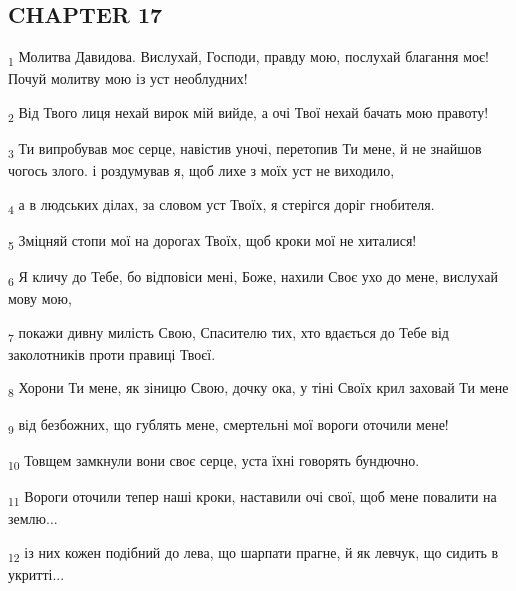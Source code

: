 \subsection{CHAPTER 17}
\begin{tcolorbox}
\textsubscript{1} Молитва Давидова. Вислухай, Господи, правду мою, послухай благання моє! Почуй молитву мою із уст необлудних!
\end{tcolorbox}
\begin{tcolorbox}
\textsubscript{2} Від Твого лиця нехай вирок мій вийде, а очі Твої нехай бачать мою правоту!
\end{tcolorbox}
\begin{tcolorbox}
\textsubscript{3} Ти випробував моє серце, навістив уночі, перетопив Ти мене, й не знайшов чогось злого. і роздумував я, щоб лихе з моїх уст не виходило,
\end{tcolorbox}
\begin{tcolorbox}
\textsubscript{4} а в людських ділах, за словом уст Твоїх, я стерігся доріг гнобителя.
\end{tcolorbox}
\begin{tcolorbox}
\textsubscript{5} Зміцняй стопи мої на дорогах Твоїх, щоб кроки мої не хиталися!
\end{tcolorbox}
\begin{tcolorbox}
\textsubscript{6} Я кличу до Тебе, бо відповіси мені, Боже, нахили Своє ухо до мене, вислухай мову мою,
\end{tcolorbox}
\begin{tcolorbox}
\textsubscript{7} покажи дивну милість Свою, Спасителю тих, хто вдається до Тебе від заколотників проти правиці Твоєї.
\end{tcolorbox}
\begin{tcolorbox}
\textsubscript{8} Хорони Ти мене, як зіницю Свою, дочку ока, у тіні Своїх крил заховай Ти мене
\end{tcolorbox}
\begin{tcolorbox}
\textsubscript{9} від безбожних, що гублять мене, смертельні мої вороги оточили мене!
\end{tcolorbox}
\begin{tcolorbox}
\textsubscript{10} Товщем замкнули вони своє серце, уста їхні говорять бундючно.
\end{tcolorbox}
\begin{tcolorbox}
\textsubscript{11} Вороги оточили тепер наші кроки, наставили очі свої, щоб мене повалити на землю...
\end{tcolorbox}
\begin{tcolorbox}
\textsubscript{12} із них кожен подібний до лева, що шарпати прагне, й як левчук, що сидить в укритті...
\end{tcolorbox}
